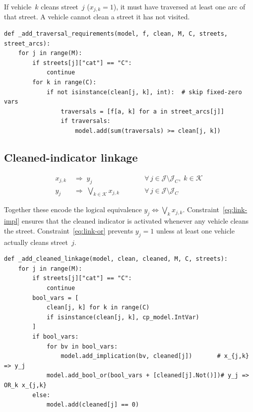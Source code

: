 \documentclass[11pt]{article}
\newcommand{\setJ}{\mathcal{J}}   %
\newcommand{\setK}{\mathcal{K}}   %
\newcommand{\Jc}{\mathcal{J}_C}   %
\begin{document}
If vehicle~$k$ cleans street~$j$ ($x_{j,k}=1$), it must have traversed at
least one arc of that street.  A vehicle cannot clean a street it has not
visited.

\begin{lstlisting}[caption={Constraint~(\ref{eq:traverse}): Traversal requirement}]
def _add_traversal_requirements(model, f, clean, M, C, streets, street_arcs):
    for j in range(M):
        if streets[j]["cat"] == "C":
            continue
        for k in range(C):
            if not isinstance(clean[j, k], int):  # skip fixed-zero vars
                traversals = [f[a, k] for a in street_arcs[j]]
                if traversals:
                    model.add(sum(traversals) >= clean[j, k])
\end{lstlisting}

\subsection{Cleaned-indicator linkage}

\begin{align}
x_{j,k} &\;\Rightarrow\; y_j
    \qquad &&\forall\, j \in \setJ \setminus \Jc,\; k \in \setK
    \label{eq:link-impl}\\[4pt]
y_j &\;\Rightarrow\; \bigvee_{k \in \setK} x_{j,k}
    \qquad &&\forall\, j \in \setJ \setminus \Jc
    \label{eq:link-or}
\end{align}

Together these encode the logical equivalence
$y_j \Leftrightarrow \bigvee_k x_{j,k}$.
Constraint~\eqref{eq:link-impl} ensures that the cleaned indicator is
activated whenever any vehicle cleans the street.
Constraint~\eqref{eq:link-or} prevents $y_j = 1$ unless at least one
vehicle actually cleans street~$j$.

\begin{lstlisting}[caption={Constraints~(\ref{eq:link-impl})\,--\,(\ref{eq:link-or}): Cleaned linkage}]
def _add_cleaned_linkage(model, clean, cleaned, M, C, streets):
    for j in range(M):
        if streets[j]["cat"] == "C":
            continue
        bool_vars = [
            clean[j, k] for k in range(C)
            if isinstance(clean[j, k], cp_model.IntVar)
        ]
        if bool_vars:
            for bv in bool_vars:
                model.add_implication(bv, cleaned[j])       # x_{j,k} => y_j
            model.add_bool_or(bool_vars + [cleaned[j].Not()])# y_j => OR_k x_{j,k}
        else:
            model.add(cleaned[j] == 0)
\end{lstlisting}
\end{document}

